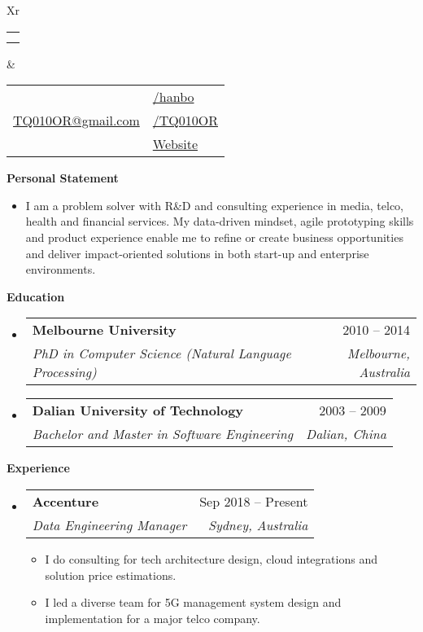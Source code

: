\documentclass[letterpaper,12pt]{article}[leftmargin=*]
\makeatletter
\def \fullname {Bo HAN}
\def \subtitle {}
\def \linkedinicon {\faLinkedin}
\def \linkedinlink {https://linkedin.com/in/hanbo/}
\def \linkedintext {/hanbo}
\def \phoneicon {\faPhone}
\def \phonetext {+61-425-719-696}
\def \emailicon {\faEnvelope}
\def \emaillink {mailto:tq010or@gmail.com}
\def \emailtext {TQ010OR@gmail.com}
\def \githubicon {\faGithub}
\def \githublink {https://github.com/tq010or}
\def \githubtext {/TQ010OR}
\def \websiteicon {\faGlobe}
\def \websitelink {http://tq010or.github.io/}
\def \websitetext {Website}
\def \headertype {\doublecol} %
\def \entryspacing {-0pt}
\def \linkedin {\linkedinicon \hspace{3pt}\href{\linkedinlink}{\linkedintext}}
\def \phone {\phoneicon \hspace{3pt}{ \phonetext}}
\def \email {\emailicon \hspace{3pt}\href{\emaillink}{\emailtext}}
\def \github {\githubicon \hspace{3pt}\href{\githublink}{\githubtext}}
\def \website {\websiteicon \hspace{3pt}\href{\websitelink}{\websitetext}}
\renewcommand{\section}[2]{\vspace{5pt}
  \colorbox{secondary}{\color{white}\raggedbottom\normalsize\textbf{{#1}{\hspace{7pt}#2}}}
}
\newcommand{\resumeEntryStart}{\begin{itemize}[leftmargin=2.5mm]}
\newcommand{\resumeEntryEnd}{\end{itemize}\vspace{\entryspacing}}
\newcommand{\resumeItemListStart}{\begin{itemize}[leftmargin=4.5mm]}
\newcommand{\resumeItemListEnd}{\end{itemize}}
\newcommand{\resumeItem}[1]{
  \item\small{
    {#1 \vspace{-2pt}}
  }
}
\newcommand{\resumeEntryTSDL}[4]{
  \vspace{-1pt}\item[]
    \begin{tabularx}{0.97\textwidth}{X@{\hspace{60pt}}r}
      \textbf{\color{primary}#1} & {\firabook\color{accent}\small#2} \\
      \textit{\color{accent}\small#3} & \textit{\color{accent}\small#4} \\
    \end{tabularx}\vspace{-6pt}
}
\newcommand{\doublecol}[6]{
  \begin{tabularx}{\textwidth}{Xr}
    {
      \begin{tabular}[c]{l}
        \fontsize{35}{45}\selectfont{\color{primary}{{\textbf{\fullname}}}} \\
        {\textit{\subtitle}} %
      \end{tabular}
    } & {
      \begin{tabular}[c]{l@{\hspace{1.5em}}l}
        {\small#4} & {\small#1} \\
        {\small#5} & {\small#2} \\
        {\small#6} & {\small#3}
      \end{tabular}
    }
  \end{tabularx}
}
\newcommand{\singlecol}[6]{
  \begin{tabularx}{\textwidth}{Xr}
    {
      \begin{tabular}[b]{l}
        \fontsize{35}{45}\selectfont{\color{primary}{{\textbf{\fullname}}}} \\
        {\textit{\subtitle}} %
      \end{tabular}
    } & {
      \begin{tabular}[c]{l}
        {\small#1} \\
        {\small#2} \\
        {\small#3} \\
        {\small#4} \\
        {\small#5} \\
        {\small#6}
      \end{tabular}
    }
  \end{tabularx}
}
\makeatother
\begin{document}


\headertype{\linkedin}{\github}{\website}{\phone}{\email}{} %
\vspace{-10pt} %

\section{\faFlask}{Personal Statement}

    \resumeItemListStart
      \resumeItem {I am a problem solver with R\&D and consulting experience in media, telco, health and financial services. My data-driven mindset, agile prototyping skills and product experience enable me to refine or create business opportunities and deliver impact-oriented solutions in both start-up and enterprise environments.}
    \resumeItemListEnd

\section{\faGraduationCap}{Education}

  \resumeEntryStart
    \resumeEntryTSDL
      {Melbourne University}{2010 -- 2014}
      {PhD in Computer Science (Natural Language Processing)}{Melbourne, Australia}
    \resumeEntryTSDL
      {Dalian University of Technology}{2003 -- 2009}
      {Bachelor and Master in Software Engineering}{Dalian, China}
  \resumeEntryEnd

\section{\faPieChart}{Experience}

  \resumeEntryStart
    \resumeEntryTSDL
      {Accenture}{Sep 2018 -- Present}
      {Data Engineering Manager}{Sydney, Australia}
    \resumeItemListStart
      \resumeItem {I do consulting for tech architecture design, cloud integrations and solution price estimations.}
      \resumeItem {I led a diverse team for 5G management system design and implementation for a major telco company.}
    \resumeItemListEnd
  \resumeEntryEnd
\end{document}
